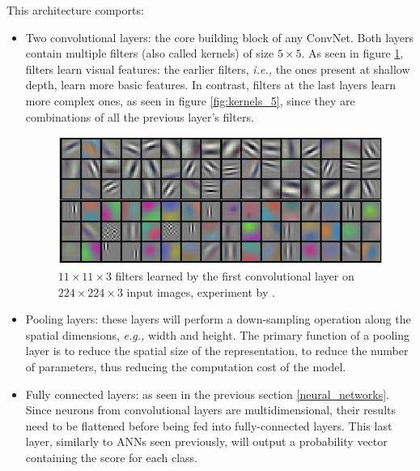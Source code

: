 This architecture comports:
\begin{itemize}
    \item Two convolutional layers: the core building block of any ConvNet. Both
          layers contain multiple filters (also called kernels) of size $5
              \times 5$. As seen in figure \ref{fig:kernels}, filters learn visual
          features: the earlier filters, \emph{i.e.,} the ones present at
          shallow depth, learn more basic features. In contrast, filters at the
          last layers learn more complex ones, as seen in figure
          \ref{fig:kernels_5}, since they are combinations of all the previous
          layer's filters.
          \begin{figure}[ht]
              \includegraphics[clip,width=1\columnwidth]{Figures/related/kernels.jpeg}
              \caption{ $11 \times 11 \times 3$ filters learned by the first convolutional
                  layer on $224 \times 224 \times 3$ input images, experiment by
                  \cite{krizhevsky_imagenet_2017-1}. }
              \label{fig:kernels}
          \end{figure}
    \item Pooling layers: these layers will perform a down-sampling operation
          along the spatial dimensions, \emph{e.g.,} width and height. The
          primary function of a pooling layer is to reduce the spatial size of
          the representation, to reduce the number of parameters, thus reducing
          the computation cost of the model.
    \item Fully connected layers: as seen in the previous section
          \ref{neural_networks}. Since neurons from convolutional layers are
          multidimensional, their results need to be flattened before being fed
          into fully-connected layers. This last layer, similarly to ANNs seen
          previously, will output a probability vector containing the score for
          each class.
\end{itemize}



